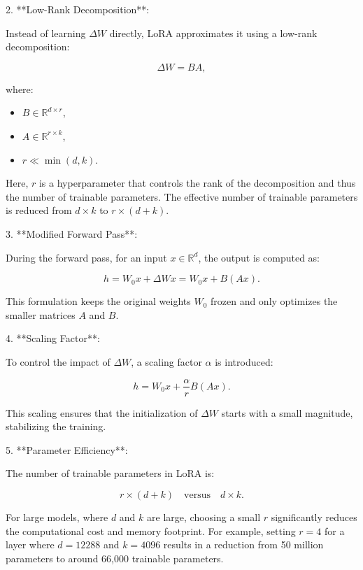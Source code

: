 \documentclass[12pt]{article}
\begin{document}
2. **Low-Rank Decomposition**:

Instead of learning \( \Delta W \) directly, LoRA approximates it using a low-rank decomposition:

\[
\Delta W = B A,
\]

where:
\begin{itemize}
    \item \( B \in \mathbb{R}^{d \times r} \),
    \item \( A \in \mathbb{R}^{r \times k} \),
    \item \( r \ll \min(d, k) \).
\end{itemize}

Here, \( r \) is a hyperparameter that controls the rank of the decomposition and thus the number of trainable parameters. The effective number of trainable parameters is reduced from \( d \times k \) to \( r \times (d + k) \).

3. **Modified Forward Pass**:

During the forward pass, for an input \( x \in \mathbb{R}^{d} \), the output is computed as:

\[
h = W_0 x + \Delta W x = W_0 x + B (A x).
\]

This formulation keeps the original weights \( W_0 \) frozen and only optimizes the smaller matrices \( A \) and \( B \).

4. **Scaling Factor**:

To control the impact of \( \Delta W \), a scaling factor \( \alpha \) is introduced:

\[
h = W_0 x + \frac{\alpha}{r} B (A x).
\]

This scaling ensures that the initialization of \( \Delta W \) starts with a small magnitude, stabilizing the training.

5. **Parameter Efficiency**:

The number of trainable parameters in LoRA is:

\[
r \times (d + k) \quad \text{versus} \quad d \times k.
\]

For large models, where \( d \) and \( k \) are large, choosing a small \( r \) significantly reduces the computational cost and memory footprint. For example, setting \( r = 4 \) for a layer where \( d = 12288 \) and \( k = 4096 \) results in a reduction from 50 million parameters to around 66,000 trainable parameters.
\end{document}
